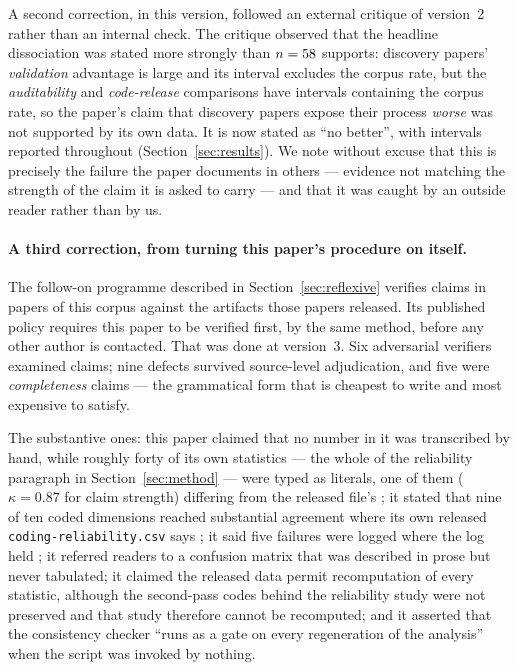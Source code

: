 A second correction, in this version, followed an external critique of version~2 rather than
an internal check. The critique observed that the headline dissociation was stated more
strongly than $n=58{}$ supports: discovery papers' \emph{validation} advantage is
large and its interval excludes the corpus rate, but the \emph{auditability} and
\emph{code-release} comparisons have intervals containing the corpus rate, so the paper's
claim that discovery papers expose their process \emph{worse} was not supported by its own
data. It is now stated as ``no better'', with intervals reported throughout
(Section~\ref{sec:results}). We note without excuse that this is precisely the failure the
paper documents in others --- evidence not matching the strength of the claim it is asked to
carry --- and that it was caught by an outside reader rather than by us.

\paragraph{A third correction, from turning this paper's procedure on itself.} The follow-on
programme described in Section~\ref{sec:reflexive} verifies claims in \nPhaseRPapers{} papers
of this corpus against the artifacts those papers released. Its published policy requires this
paper to be verified first, by the same method, before any other author is contacted. That was
done at version~3. Six adversarial verifiers examined \nSelfClaims{} claims; nine defects
survived source-level adjudication, and five were \emph{completeness} claims --- the
grammatical form that is cheapest to write and most expensive to satisfy.

The substantive ones: this paper claimed that no number in it was transcribed by hand, while
roughly forty of its own statistics --- the whole of the reliability paragraph in
Section~\ref{sec:method} --- were typed as literals, one of them ($\kappa=0.87$ for claim
strength) differing from the released file's \kappaDEight{}; it stated that nine of ten coded
dimensions reached substantial agreement where its own released
\texttt{coding-reliability.csv} says \nRelSubstantial{}; it said five failures were logged
where the log held \nErrLogged{}; it referred readers to a confusion matrix that was described
in prose but never tabulated; it claimed the released data permit recomputation of every
statistic, although the second-pass codes behind the reliability study were not preserved and
that study therefore cannot be recomputed; and it asserted that the consistency checker
``runs as a gate on every regeneration of the analysis'' when the script was invoked by
nothing.

